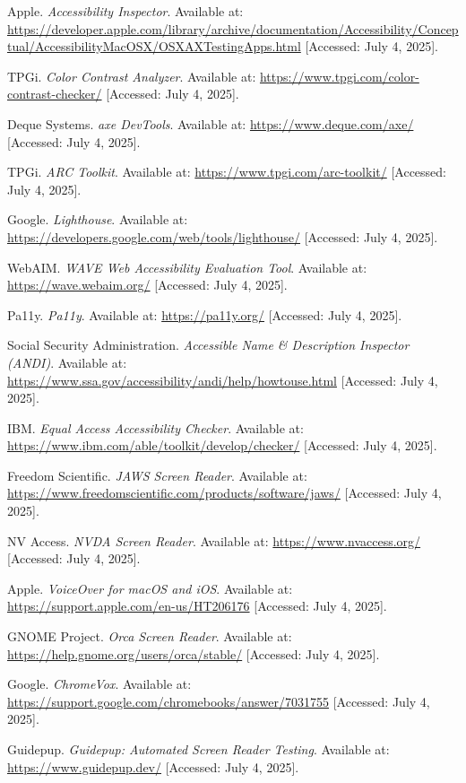 \begin{thebibliography}{99}
 Apple. \textit{Accessibility Inspector}. Available at: \url{https://developer.apple.com/library/archive/documentation/Accessibility/Conceptual/AccessibilityMacOSX/OSXAXTestingApps.html} [Accessed: July 4, 2025].

 TPGi. \textit{Color Contrast Analyzer}. Available at: \url{https://www.tpgi.com/color-contrast-checker/} [Accessed: July 4, 2025].

 Deque Systems. \textit{axe DevTools}. Available at: \url{https://www.deque.com/axe/} [Accessed: July 4, 2025].

 TPGi. \textit{ARC Toolkit}. Available at: \url{https://www.tpgi.com/arc-toolkit/} [Accessed: July 4, 2025].

 Google. \textit{Lighthouse}. Available at: \url{https://developers.google.com/web/tools/lighthouse/} [Accessed: July 4, 2025].

 WebAIM. \textit{WAVE Web Accessibility Evaluation Tool}. Available at: \url{https://wave.webaim.org/} [Accessed: July 4, 2025].

 Pa11y. \textit{Pa11y}. Available at: \url{https://pa11y.org/} [Accessed: July 4, 2025].

 Social Security Administration. \textit{Accessible Name \& Description Inspector (ANDI)}. Available at: \url{https://www.ssa.gov/accessibility/andi/help/howtouse.html} [Accessed: July 4, 2025].

 IBM. \textit{Equal Access Accessibility Checker}. Available at: \url{https://www.ibm.com/able/toolkit/develop/checker/} [Accessed: July 4, 2025].

 Freedom Scientific. \textit{JAWS Screen Reader}. Available at: \url{https://www.freedomscientific.com/products/software/jaws/} [Accessed: July 4, 2025].

 NV Access. \textit{NVDA Screen Reader}. Available at: \url{https://www.nvaccess.org/} [Accessed: July 4, 2025].

 Apple. \textit{VoiceOver for macOS and iOS}. Available at: \url{https://support.apple.com/en-us/HT206176} [Accessed: July 4, 2025].

 GNOME Project. \textit{Orca Screen Reader}. Available at: \url{https://help.gnome.org/users/orca/stable/} [Accessed: July 4, 2025].

 Google. \textit{ChromeVox}. Available at: \url{https://support.google.com/chromebooks/answer/7031755} [Accessed: July 4, 2025].

 Guidepup. \textit{Guidepup: Automated Screen Reader Testing}. Available at: \url{https://www.guidepup.dev/} [Accessed: July 4, 2025].

\end{thebibliography}
